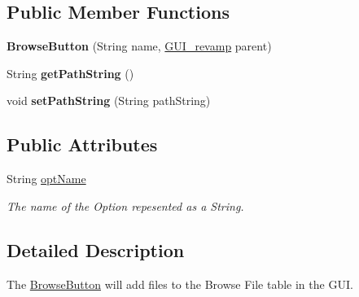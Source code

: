 \subsection*{Public Member Functions}
\begin{DoxyCompactItemize}
\item 
\hypertarget{classedu_1_1udel_1_1cis_1_1vsl_1_1civl_1_1gui_1_1common_1_1BrowseButton_ab01d92af65d906c9307b813a443d4830}{}{\bfseries Browse\+Button} (String name, \hyperlink{classedu_1_1udel_1_1cis_1_1vsl_1_1civl_1_1gui_1_1common_1_1GUI__revamp}{G\+U\+I\+\_\+revamp} parent)\label{classedu_1_1udel_1_1cis_1_1vsl_1_1civl_1_1gui_1_1common_1_1BrowseButton_ab01d92af65d906c9307b813a443d4830}

\item 
\hypertarget{classedu_1_1udel_1_1cis_1_1vsl_1_1civl_1_1gui_1_1common_1_1BrowseButton_a22ed438682b48a478d75eca161a074cd}{}String {\bfseries get\+Path\+String} ()\label{classedu_1_1udel_1_1cis_1_1vsl_1_1civl_1_1gui_1_1common_1_1BrowseButton_a22ed438682b48a478d75eca161a074cd}

\item 
\hypertarget{classedu_1_1udel_1_1cis_1_1vsl_1_1civl_1_1gui_1_1common_1_1BrowseButton_a7517039b9364c1f88358f292ef90a37d}{}void {\bfseries set\+Path\+String} (String path\+String)\label{classedu_1_1udel_1_1cis_1_1vsl_1_1civl_1_1gui_1_1common_1_1BrowseButton_a7517039b9364c1f88358f292ef90a37d}

\end{DoxyCompactItemize}
\subsection*{Public Attributes}
\begin{DoxyCompactItemize}
\item 
\hypertarget{classedu_1_1udel_1_1cis_1_1vsl_1_1civl_1_1gui_1_1common_1_1BrowseButton_a087ea8096d40de1534c187fdc5377e63}{}String \hyperlink{classedu_1_1udel_1_1cis_1_1vsl_1_1civl_1_1gui_1_1common_1_1BrowseButton_a087ea8096d40de1534c187fdc5377e63}{opt\+Name}\label{classedu_1_1udel_1_1cis_1_1vsl_1_1civl_1_1gui_1_1common_1_1BrowseButton_a087ea8096d40de1534c187fdc5377e63}

\begin{DoxyCompactList}\small\item\em The name of the Option repesented as a String. \end{DoxyCompactList}\end{DoxyCompactItemize}


\subsection{Detailed Description}
The \hyperlink{classedu_1_1udel_1_1cis_1_1vsl_1_1civl_1_1gui_1_1common_1_1BrowseButton}{Browse\+Button} will add files to the Browse File table in the G\+U\+I. 

